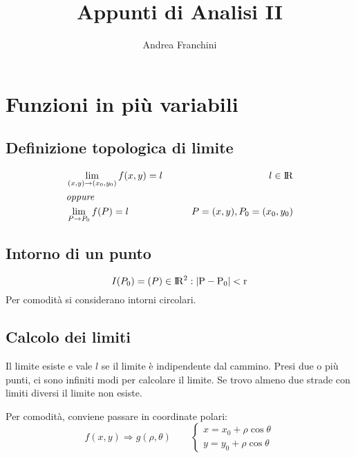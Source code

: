 \documentclass[10pt,a4paper,fleqn]{article}
\author{Andrea Franchini}
\title{Appunti di Analisi II}
\begin{document}
	\maketitle
	\clearpage
	
	\tableofcontents
	\clearpage

	\section{Funzioni in più variabili}

	\subsection{Definizione topologica di limite}

	\begin{equation}
	\begin{split}
		&\lim_{(x, y) \to (x_0, y_0)} f(x, y) = l \qquad &l \in \rm I\!R \\
		&\textit{oppure}\\
		&\lim_{P \to P_0} f(P) = l \qquad &P=(x, y), P_0=(x_0, y_0)
	\end{split}
	\end{equation}

	\subsection{Intorno di un punto}

	\begin{equation}
	I(P_0) = {(P) \in \rm I\!R^2: |P - P_0| < r}
	\end{equation}
	Per comodità si considerano intorni circolari.

	\subsection{Calcolo dei limiti}

	Il limite esiste e vale $l$ se il limite è indipendente dal cammino.
	Presi due o più punti, ci sono infiniti modi per calcolare il limite.
	Se trovo almeno due strade con limiti diversi il limite non esiste.
	
	Per comodità, conviene passare in coordinate polari:
	\begin{equation}
	f(x, y) \Rightarrow g(\rho, \theta) \qquad
	\begin{cases}
	x=x_0 + \rho \cos \theta \\
	y=y_0 + \rho \cos \theta
	\end{cases}
	\end{equation}
\end{document}
